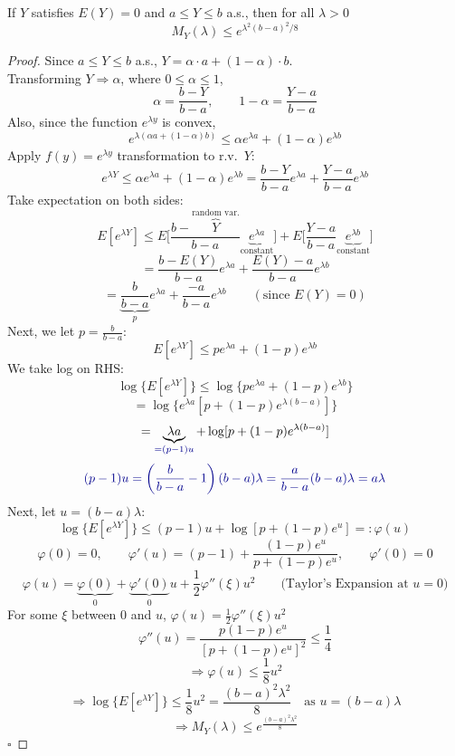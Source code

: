 \begin{lemma}
    If $Y$ satisfies $E(Y) = 0$ and $a\leq Y \leq b$ a.s., then for all $\lambda > 0$
    \[M_Y(\lambda) \leq e^{\lambda^2(b-a)^2/8}\]
    \begin{proof}
        Since $a \leq Y \leq b$ a.s., $Y = \alpha \cdot a + (1-\alpha)\cdot b$.
        \\ Transforming $Y \Rightarrow \alpha$, where $0 \leq \alpha \leq 1$,
        \[\alpha = \frac{b-Y}{b-a}, \qquad 1-\alpha = \frac{Y-a}{b-a}\]
        Also, since the function $e^{\lambda y}$ is convex,
        \[e^{\lambda(\alpha a + (1-\alpha)b)} \leq \alpha e^{\lambda a} + (1-\alpha)e^{\lambda b}\]
        Apply $f(y) = e^{\lambda y}$ transformation to r.v.\ $Y$:
        \[e^{\lambda Y} \leq \alpha e^{\lambda a} + (1-\alpha)e^{\lambda b} = \frac{b-Y}{b-a}e^{\lambda a} + \frac{Y-a}{b-a}e^{\lambda b}\]
        Take expectation on both sides:
        \[E[e^{\lambda Y}] \leq E\Big[\frac{b-\overbrace{Y}^{\text{random var.}}}{b-a}\underbrace{e^{\lambda a}}_{\text{constant}}\Big] + E\Big[\frac{Y-a}{b-a}\underbrace{e^{\lambda b}}_{\text{constant}}\Big]\]
        \[= \frac{b-E(Y)}{b-a}e^{\lambda a} + \frac{E(Y)-a}{b-a}e^{\lambda b}\]
        \[= \underbrace{\frac{b}{b-a}}_{p}e^{\lambda a} + \frac{-a}{b-a}e^{\lambda b} \qquad (\text{since } E(Y) = 0)\]
        Next, we let $p = \frac{b}{b-a}$:
        \[E[e^{\lambda Y}] \leq pe^{\lambda a} + (1-p)e^{\lambda b}\]
        We take log on RHS:
        \[\log\{E[e^{\lambda Y}]\} \leq \log\{pe^{\lambda a} + (1-p)e^{\lambda b}\}\]
        \[= \log\{e^{\lambda a}[p + (1-p)e^{\lambda(b-a)}]\}\]
        \[= \underbrace{\lambda a}_{\textcolor{blue!55!black}{=(p-1)u}} + \log[p + (1-p)e^{\lambda(b-a)}]\]
        \[\textcolor{blue!55!black}{(p-1)u = \left(\frac{b}{b-a}-1\right)(b-a)\lambda = \frac{a}{b-a}(b-a)\lambda = a\lambda}\]
        Next, let $u = (b-a)\lambda$:
        \[\log\{E[e^{\lambda Y}]\} \leq (p-1)u + \log[p + (1-p)e^u] =: \varphi(u)\]
        \[\varphi(0) = 0, \qquad \varphi'(u) = (p-1) + \frac{(1-p)e^u}{p+(1-p)e^u}, \qquad \varphi'(0) = 0\]
        \[\varphi(u) = \underbrace{\varphi(0)}_{0} + \underbrace{\varphi'(0)}_{0}u + \frac{1}{2}\varphi''(\xi)u^2 \qquad \text{(Taylor's Expansion at } u = 0)\]
        For some $\xi$ between $0$ and $u$, \quad $\varphi(u) = \frac{1}{2}\varphi''(\xi)u^2$
        \[\varphi''(u) = \frac{p(1-p)e^u}{[p+(1-p)e^u]^2} \leq \frac{1}{4}\]
        \[\Rightarrow \varphi(u) \leq \frac{1}{8}u^2\]
        \[\Rightarrow \log\{E[e^{\lambda Y}]\} \leq \frac{1}{8}u^2 = \frac{(b-a)^2\lambda^2}{8} \quad \text{as } u = (b-a)\lambda\]
        \[\Rightarrow M_Y(\lambda) \leq e^{\frac{(b-a)^2\lambda^2}{8}}\]
        \hfill $\square$
    \end{proof}
\end{lemma}

